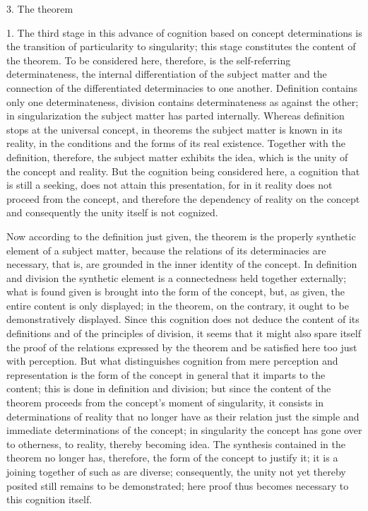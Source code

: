 3. The theorem

1. The third stage in this advance of cognition
based on concept determinations is
the transition of particularity to singularity;
this stage constitutes the content of the theorem.
To be considered here, therefore,
is the self-referring determinateness,
the internal differentiation of the subject matter
and the connection of the differentiated determinacies to one another.
Definition contains only one determinateness,
division contains determinateness as against the other;
in singularization the subject matter has parted internally.
Whereas definition stops at the universal concept,
in theorems the subject matter is known in its reality,
in the conditions and the forms of its real existence.
Together with the definition, therefore,
the subject matter exhibits the idea,
which is the unity of the concept and reality.
But the cognition being considered here,
a cognition that is still a seeking,
does not attain this presentation,
for in it reality does not proceed from the concept,
and therefore the dependency of reality on the concept
and consequently the unity itself is not cognized.

Now according to the definition just given,
the theorem is the properly
synthetic element of a subject matter,
because the relations of its determinacies are necessary,
that is, are grounded in the inner identity of the concept.
In definition and division the synthetic element is
a connectedness held together externally;
what is found given is brought into the form of the concept,
but, as given, the entire content is only displayed;
in the theorem, on the contrary,
it ought to be demonstratively displayed.
Since this cognition does not deduce
the content of its definitions
and of the principles of division,
it seems that it might also spare itself
the proof of the relations expressed by the theorem
and be satisfied here too just with perception.
But what distinguishes cognition
from mere perception and representation is
the form of the concept in general
that it imparts to the content;
this is done in definition and division;
but since the content of the theorem proceeds
from the concept's moment of singularity,
it consists in determinations of reality
that no longer have as their relation
just the simple and immediate
determinations of the concept;
in singularity the concept has gone over
to otherness, to reality,
thereby becoming idea.
The synthesis contained in the
theorem no longer has, therefore,
the form of the concept to justify it;
it is a joining together of such as are diverse;
consequently, the unity not yet thereby
posited still remains to be demonstrated;
here proof thus becomes necessary
to this cognition itself.

